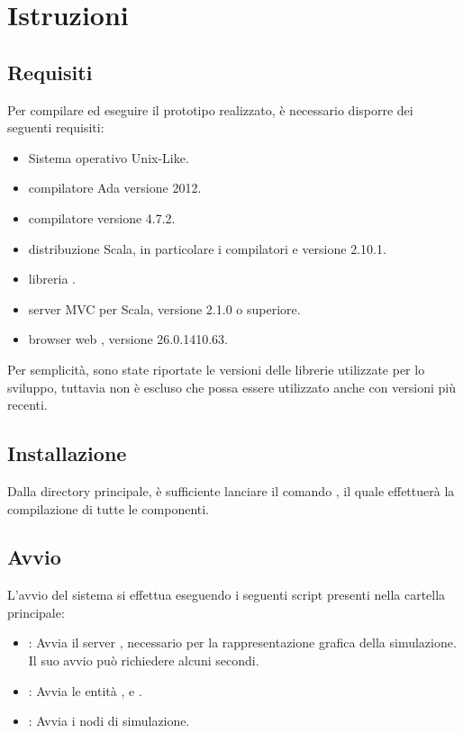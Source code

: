 \appendix
\chapter{Istruzioni}
	
	\section{Requisiti}
	
	Per compilare ed eseguire il prototipo realizzato, è necessario disporre dei seguenti requisiti:
	
	\begin{itemize}
		\item Sistema operativo Unix-Like.
		\item compilatore Ada  versione 2012.
		\item compilatore  versione 4.7.2.
		\item distribuzione Scala, in particolare i compilatori  e  versione 2.10.1.
		\item libreria .
		\item server MVC  per Scala, versione 2.1.0 o superiore.
		\item browser web , versione 26.0.1410.63.
	\end{itemize}
	
	Per semplicità, sono state riportate le versioni delle librerie utilizzate per lo sviluppo, tuttavia non è escluso che possa essere utilizzato anche con versioni più recenti.
	
	\section{Installazione}
	
	Dalla directory principale, è sufficiente lanciare il comando , il quale effettuerà la compilazione di tutte le componenti.
	
	\section{Avvio}
	
	L'avvio del sistema si effettua eseguendo i seguenti script presenti nella cartella principale:
	
		\begin{itemize}
			\item {} : Avvia il server , necessario per la rappresentazione grafica della simulazione. Il suo avvio può richiedere alcuni secondi.
			\item {} : Avvia le entità ,  e .
			\item {} : Avvia i nodi di simulazione.
		\end{itemize}
		
